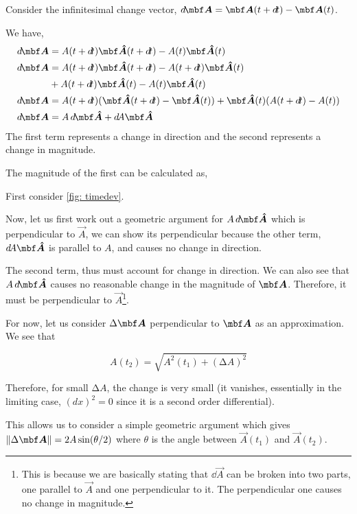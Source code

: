 \begin{example}
    Consider the infinitesimal change vector, \(\dd{\Aa} = \Aa(t + \dd{t}) - \Aa(t)\).
    
    We have, 
    \begin{align*}
        \dd{\Aa} &= A(t + \dd{t})\unitv{A}(t + \dd{t}) - A(t)\unitv{A}(t) \\
        \dd{\Aa} &= A(t + \dd{t})\unitv{A}(t + \dd{t}) - A(t + \dd{t})\unitv{A}(t) \\ 
        & + A(t + \dd{t})\unitv{A}(t) - A(t)\unitv{A}(t) \\
        \dd{\Aa} &= A(t + \dd{t})(\unitv{A}(t + \dd{t}) - \unitv{A}(t)) + \unitv{A}(t)(A(t + \dd{t}) - A(t)) \\
        \dd{\Aa} &= A\dd{\unitv{A}} + \dd{A}\unitv{A} 
    \end{align*}
The first term represents a change in direction and the second represents a change in 
magnitude.
\end{example}

The magnitude of the first can be calculated as,

First consider \cref{fig: timedev}.

Now, let us first work out a geometric argument for \(A\dd{\unitv{A}}\)
which is perpendicular to \(\vec{A}\), we can show its perpendicular because 
the other term, \(\dd{A} \unitv{A}\) is parallel to \(A\), and causes no change in direction. 

The second term, thus must account for change in direction. We can also see that \(A\dd{\unitv{A}}\)
causes no reasonable change in the magnitude of \(\Aa\). Therefore, it must be perpendicular to \(\vec{A}\)\footnote{This is because we are basically stating that \(\dd{\vec{A}}\) can be broken into two parts,
one parallel to \(\vec{A}\) and one perpendicular to it. The perpendicular one causes 
no change in magnitude.}.

For now, let us consider \(\increment \Aa\) perpendicular to \(\Aa\) as an approximation. We see that 

\begin{equation*}
    A(t_2) = \sqrt{A^2(t_1) + (\increment A)^2}
\end{equation*}

Therefore, for small \(\increment A\), the change is very small (it vanishes, essentially 
in the limiting case, \((dx)^2 = 0\) since it is a second order differential).

This allows us to consider a simple geometric argument which gives \(\norm{\increment \vec{A}} = 2A\sin(\theta/2)\)
where \(\theta\) is the angle between \(\vec{A}(t_1)\) and \(\vec{A}(t_2)\).

